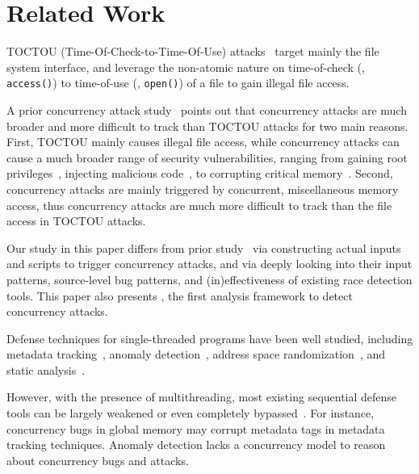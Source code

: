 \section{Related Work} \label{sec:related}


 TOCTOU (Time-Of-Check-to-Time-Of-Use) 
attacks~\cite{bishop:tocttou,toctou:fast08, toctou:fast05,toctou:usec03} target 
mainly the file system interface, and leverage the non-atomic nature on 
time-of-check (\eg, \texttt{access()}) to time-of-use (\eg, \texttt{open()}) of
a file to gain illegal file access.

A prior concurrency attack study~\cite{con-tr} points out that concurrency 
attacks are much broader and more difficult to track than TOCTOU attacks for 
two main reasons. First, TOCTOU mainly causes illegal file access, while 
concurrency attacks can cause a much broader range of security vulnerabilities, 
ranging from gaining root privileges~\cite{uselib-bug-12791}, injecting 
malicious code~\cite{freebsd-exploit-2009-3527}, to corrupting critical 
memory~\cite{apache-bug-25520}. Second, concurrency attacks are mainly
triggered by concurrent, miscellaneous memory access, thus concurrency attacks 
are much more difficult to track than the file access in TOCTOU attacks.

Our study in this paper differs from prior study~\cite{con-tr} via 
constructing actual inputs and scripts to trigger \nreproduced concurrency 
attacks, and via deeply looking into their input patterns, source-level bug 
patterns, and (in)effectiveness of existing race detection tools. This paper 
also presents \xxx, the first analysis framework to detect concurrency attacks.

 Defense techniques for single-threaded
programs have been well studied, including
metadata tracking~\cite{taintdroid:osdi10,
lift:micro06,myers:information,valgrind:pldi}, anomaly
detection~\cite{taskrecycling:ppopp90,schonberg:pldi89}, address space
randomization~\cite{ aslr-fail:ccs04}, and static
analysis~\cite{seth:pldi,engler:vmcai,wagner:syscall:ids,coverity:cacm,
klee:osdi08}.

However, with the presence of multithreading, most existing sequential defense 
tools can be largely weakened or even completely bypassed~\cite{con-tr}. For 
instance, concurrency bugs in global memory may corrupt metadata tags in 
metadata tracking techniques. Anomaly detection lacks a concurrency model to 
reason about concurrency bugs and attacks.

